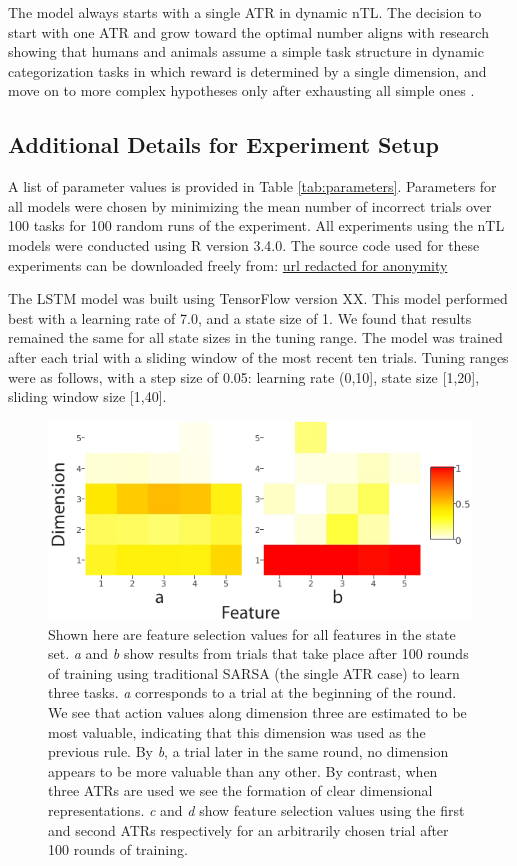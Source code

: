 \documentclass[10pt,letterpaper]{article}
\begin{document}
The model always starts with a single ATR in dynamic nTL. The decision to start with one ATR and grow toward the optimal number aligns with research showing that humans and animals assume a simple task structure in dynamic categorization tasks in which reward is determined by a single dimension, and move on to more complex hypotheses only after exhausting all simple ones \cite{shepard_learning_1961}.

\subsection{Additional Details for Experiment Setup}

A list of parameter values is provided in Table \ref{tab:parameters}. Parameters for all models were chosen by minimizing the mean number of incorrect trials over 100 tasks for 100 random runs of the experiment. All experiments using the nTL models were conducted using R version 3.4.0. The source code used for these experiments can be downloaded freely from: \url{url redacted for anonymity}

The LSTM model was built using TensorFlow version XX. This model performed best with a learning rate of 7.0, and a state size of 1. We found that results remained the same for all state sizes in the tuning range. The model was trained after each trial with a sliding window of the most recent ten trials. Tuning ranges were as follows, with a step size of 0.05: learning rate (0,10], state size [1,20], sliding window size [1,40].

\begin{figure}[b!]
  \centering
  \includegraphics[scale=1.0]{images/actionvals_hm.pdf}
  \caption[]{Shown here are feature selection values for all features in the state set. \textit{a} and \textit{b} show results from trials that take place after 100 rounds of training using traditional SARSA (the single ATR case) to learn three tasks. \textit{a} corresponds to a trial at the beginning of the round. We see that action values along dimension three are estimated to be most valuable, indicating that this dimension was used as the previous rule. By \textit{b}, a trial later in the same round, no dimension appears to be more valuable than any other. By contrast, when three ATRs are used we see the formation of clear dimensional representations. \textit{c} and \textit{d} show feature selection values using the first and second ATRs respectively for an arbitrarily chosen trial after 100 rounds of training.}
  \label{fig:actionvals_hm}
\end{figure}
\end{document}

